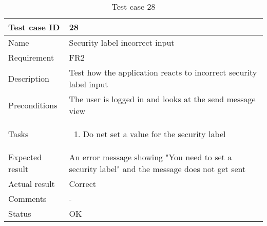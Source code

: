 				\begin{table}
			\begin{tabular}{l|p{10cm}}
				Test case ID & 28\\ \hline
				Name &Security label incorrect input\\ \hline
				Requirement & FR2\\ \hline
				Description&Test how the application reacts to incorrect security label input\\ \hline
				Preconditions&The user is logged in and looks at the send message view\\ \hline
				Tasks&\begin{enumerate}
						\item{}Do net set a value for the security label
					\end{enumerate} \\ \hline
				Expected result&An error message showing "You need to set a security label" and the message does not get sent\\ \hline
				Actual result& Correct\\ \hline
				Comments&- \\ \hline
				Status& OK\\ \hline 
			\end{tabular}
			\caption{Test case 28} \label{tab:case28}
			\end{table}
